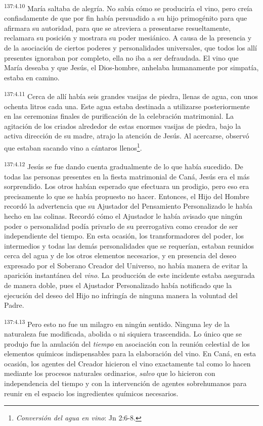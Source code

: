 \par
\textsuperscript{137:4.10} María saltaba de alegría. No sabía cómo se produciría el vino, pero creía confiadamente de que por fin había persuadido a su hijo primogénito para que afirmara su autoridad, para que se atreviera a presentarse resueltamente, reclamara su posición y mostrara su poder mesiánico. A causa de la presencia y de la asociación de ciertos poderes y personalidades universales, que todos los allí presentes ignoraban por completo, ella no iba a ser defraudada. El vino que María deseaba y que Jesús, el Dios-hombre, anhelaba humanamente por simpatía, estaba en camino.

\par
\textsuperscript{137:4.11} Cerca de allí había seis grandes vasijas de piedra, llenas de agua, con unos ochenta litros cada una. Este agua estaba destinada a utilizarse posteriormente en las ceremonias finales de purificación de la celebración matrimonial. La agitación de los criados alrededor de estas enormes vasijas de piedra, bajo la activa dirección de su madre, atrajo la atención de Jesús. Al acercarse, observó que estaban sacando vino a cántaros llenos\footnote{\textit{Conversión del agua en vino}: Jn 2:6-8.}.

\par
\textsuperscript{137:4.12} Jesús se fue dando cuenta gradualmente de lo que había sucedido. De todas las personas presentes en la fiesta matrimonial de Caná, Jesús era el más sorprendido. Los otros habían esperado que efectuara un prodigio, pero eso era precisamente lo que se había propuesto no hacer. Entonces, el Hijo del Hombre recordó la advertencia que su Ajustador del Pensamiento Personalizado le había hecho en las colinas. Recordó cómo el Ajustador le había avisado que ningún poder o personalidad podía privarlo de su prerrogativa como creador de ser independiente del tiempo. En esta ocasión, los transformadores del poder, los intermedios y todas las demás personalidades que se requerían, estaban reunidos cerca del agua y de los otros elementos necesarios, y en presencia del deseo expresado por el Soberano Creador del Universo, no había manera de evitar la aparición instantánea del \textit{vino}. La producción de este incidente estaba asegurada de manera doble, pues el Ajustador Personalizado había notificado que la ejecución del deseo del Hijo no infringía de ninguna manera la voluntad del Padre.

\par
\textsuperscript{137:4.13} Pero esto no fue un milagro en ningún sentido. Ninguna ley de la naturaleza fue modificada, abolida o ni siquiera trascendida. Lo único que se produjo fue la anulación del \textit{tiempo} en asociación con la reunión celestial de los elementos químicos indispensables para la elaboración del vino. En Caná, en esta ocasión, los agentes del Creador hicieron el vino exactamente tal como lo hacen mediante los procesos naturales ordinarios, \textit{salvo} que lo hicieron con independencia del tiempo y con la intervención de agentes sobrehumanos para reunir en el espacio los ingredientes químicos necesarios.

